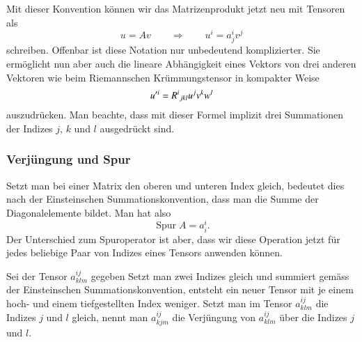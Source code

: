 Mit dieser Konvention können wir das Matrizenprodukt jetzt neu mit
Tensoren als
\begin{equation}
u=Av
\qquad\Rightarrow\qquad
u^i = a^i_jv^j
\end{equation}
schreiben.
Offenbar ist diese Notation nur unbedeutend komplizierter.
Sie ermöglicht nun aber auch die lineare Abhängigkeit eines
Vektors von drei anderen Vektoren wie beim Riemannschen Krümmungstensor
in kompakter Weise
\[
u'^i
=
R^i\mathstrut_{jkl}u^jv^kw^l
\]
auszudrücken.
Man beachte, dass mit dieser Formel implizit drei Summationen der Indizes
$j$, $k$ und $l$ ausgedrückt sind.

\subsubsection{Verjüngung und Spur}
Setzt man bei einer Matrix den oberen und unteren Index gleich, bedeutet
dies nach der Einsteinschen Summationskonvention, dass man die Summe
der Diagonalelemente bildet.
Man hat also
\[
\operatorname{Spur}A=a_i^i.
\]
Der Unterschied zum Spuroperator ist aber, dass wir diese Operation
jetzt für jedes beliebige Paar von Indizes eines Tensors anwenden können.
\begin{definition}
\label{tensor:definition:verjuengung}
Sei der Tensor $a^{ij}_{klm}$ gegeben
Setzt man zwei Indizes gleich und summiert gemäss der Einsteinschen
Summationskonvention, entsteht ein neuer Tensor mit je einem hoch-
und einem tiefgestellten Index weniger.
Setzt man im Tensor $a^{ij}_{klm}$ die Indizes $j$ und $l$ gleich,
nennt man $a^{ij}_{kjm}$ die Verjüngung von $a^{ij}_{klm}$ über die
Indizes $j$ und $l$.
\end{definition}

